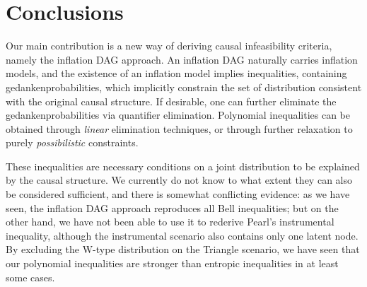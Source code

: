 \section{Conclusions}

Our main contribution is a new way of deriving causal infeasibility criteria, namely the inflation DAG approach. An inflation DAG naturally carries inflation models, and the existence of an inflation model implies inequalities, containing gedankenprobabilities, which implicitly constrain the set of distribution consistent with the original causal structure. If desirable, one can further eliminate the gedankenprobabilities via quantifier elimination. Polynomial inequalities can be obtained through \emph{linear} elimination techniques, or through further relaxation to purely \emph{possibilistic} constraints.

These inequalities are necessary conditions on a joint distribution to be explained by the causal structure. We currently do not know to what extent they can also be considered sufficient, and there is somewhat conflicting evidence: as we have seen, the inflation DAG approach reproduces all Bell inequalities; but on the other hand, we have not been able to use it to rederive Pearl's instrumental inequality, although the instrumental scenario also contains only one latent node. By excluding the W-type distribution on the Triangle scenario, we have seen that our polynomial inequalities are stronger than entropic inequalities in at least some cases.

